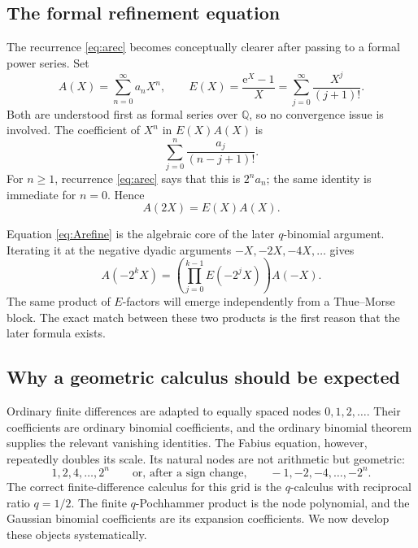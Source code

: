\documentclass[11pt,oneside]{article}
\theoremstyle{definition}
\theoremstyle{remark}
\newcommand{\Q}{\mathbb Q}
\newcommand{\e}{\mathrm e}
\begin{document}
\subsection{The formal refinement equation}

The recurrence \eqref{eq:arec} becomes conceptually clearer after passing to a formal power series.  Set
\begin{equation}\label{eq:Adef}
  A(X)=\sum_{n=0}^{\infty}a_nX^n,
  \qquad
  E(X)=\frac{\e^X-1}{X}
      =\sum_{j=0}^{\infty}\frac{X^j}{(j+1)!}.
\end{equation}
Both are understood first as formal series over $\Q$, so no convergence issue is involved.  The coefficient of $X^n$ in $E(X)A(X)$ is
\[
  \sum_{j=0}^{n}\frac{a_j}{(n-j+1)!}.
\]
For $n\ge1$, recurrence \eqref{eq:arec} says that this is $2^na_n$; the same identity is immediate for $n=0$.  Hence
\begin{equation}\label{eq:Arefine}
  \boxed{A(2X)=E(X)A(X).}
\end{equation}

Equation \eqref{eq:Arefine} is the algebraic core of the later $q$-binomial argument.  Iterating it at the negative dyadic arguments $-X,-2X,-4X,\ldots$ gives
\begin{equation}\label{eq:Aiterate}
 A(-2^kX)
  =\left(\prod_{j=0}^{k-1}E(-2^jX)\right)A(-X).
\end{equation}
The same product of $E$-factors will emerge independently from a Thue--Morse block.  The exact match between these two products is the first reason that the later formula exists.

\subsection{Why a geometric calculus should be expected}

Ordinary finite differences are adapted to equally spaced nodes $0,1,2,\ldots$.  Their coefficients are ordinary binomial coefficients, and the ordinary binomial theorem supplies the relevant vanishing identities.  The Fabius equation, however, repeatedly doubles its scale.  Its natural nodes are not arithmetic but geometric:
\[
  1,2,4,\ldots,2^n
  \qquad\text{or, after a sign change,}\qquad
  -1,-2,-4,\ldots,-2^n.
\]
The correct finite-difference calculus for this grid is the $q$-calculus with reciprocal ratio $q=1/2$.  The finite $q$-Pochhammer product is the node polynomial, and the Gaussian binomial coefficients are its expansion coefficients.  We now develop these objects systematically.
\end{document}
